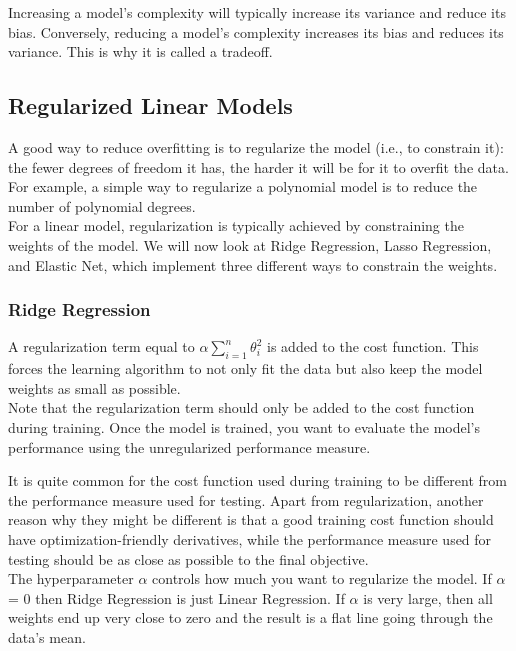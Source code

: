 \documentclass[french]{article}
\begin{document}
Increasing a model’s complexity will typically increase its variance and reduce its bias.  Conversely, reducing a model’s complexity increases its bias and reduces its variance.  This is why it is called a tradeoff.

\subsection{Regularized Linear Models}

A good way to reduce overfitting is to regularize the model (i.e., to constrain it): the fewer degrees of freedom it has, the harder it will be for it to overfit the data. For example, a simple way to regularize a polynomial model is to reduce the number of polynomial degrees.\\

For a linear model, regularization is typically achieved by constraining the weights of the model. We will now look at Ridge Regression, Lasso Regression, and Elastic Net, which implement three different ways to constrain the weights.

\subsubsection{Ridge Regression}

A regularization term equal to $\alpha \sum_{i=1}^n \theta_i^2$ is added to the cost function. This forces the learning algorithm to not only fit the data but also keep the model weights as small as possible.\\

Note that the regularization term should only be added to the cost function during training. Once the model is trained, you want to evaluate the model’s performance using the unregularized performance measure.

It is quite common for the cost function used during training to be different from the performance measure used for testing. Apart from regularization, another reason why they might be different is that a good training cost function should have optimization-friendly derivatives, while the performance measure used for testing should be as close as possible to the final objective.\\

The hyperparameter $\alpha$ controls how much you want to regularize the model. If $\alpha$ = 0 then Ridge Regression is just Linear Regression. If $\alpha$ is very large, then all weights end up very close to zero and the result is a flat line going through the data’s mean.
\end{document}
